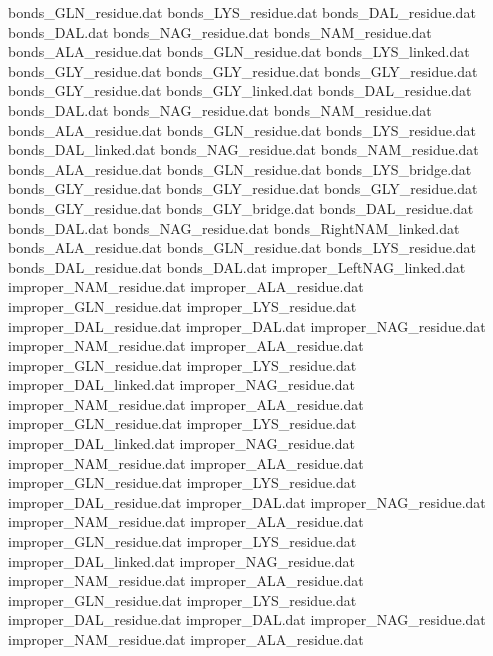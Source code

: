 bonds_GLN_residue.dat           
bonds_LYS_residue.dat           
bonds_DAL_residue.dat           
bonds_DAL.dat                   
bonds_NAG_residue.dat           
bonds_NAM_residue.dat           
bonds_ALA_residue.dat           
bonds_GLN_residue.dat           
bonds_LYS_linked.dat            
bonds_GLY_residue.dat
bonds_GLY_residue.dat
bonds_GLY_residue.dat
bonds_GLY_residue.dat
bonds_GLY_linked.dat
bonds_DAL_residue.dat           
bonds_DAL.dat                   
bonds_NAG_residue.dat           
bonds_NAM_residue.dat           
bonds_ALA_residue.dat           
bonds_GLN_residue.dat           
bonds_LYS_residue.dat           
bonds_DAL_linked.dat            
bonds_NAG_residue.dat           
bonds_NAM_residue.dat           
bonds_ALA_residue.dat           
bonds_GLN_residue.dat           
bonds_LYS_bridge.dat            
bonds_GLY_residue.dat
bonds_GLY_residue.dat
bonds_GLY_residue.dat
bonds_GLY_residue.dat
bonds_GLY_bridge.dat
bonds_DAL_residue.dat           
bonds_DAL.dat                   
bonds_NAG_residue.dat           
bonds_RightNAM_linked.dat       
bonds_ALA_residue.dat           
bonds_GLN_residue.dat           
bonds_LYS_residue.dat           
bonds_DAL_residue.dat           
bonds_DAL.dat                   
improper_LeftNAG_linked.dat     
improper_NAM_residue.dat        
improper_ALA_residue.dat        
improper_GLN_residue.dat        
improper_LYS_residue.dat        
improper_DAL_residue.dat        
improper_DAL.dat                
improper_NAG_residue.dat        
improper_NAM_residue.dat        
improper_ALA_residue.dat        
improper_GLN_residue.dat        
improper_LYS_residue.dat        
improper_DAL_linked.dat         
improper_NAG_residue.dat        
improper_NAM_residue.dat        
improper_ALA_residue.dat        
improper_GLN_residue.dat        
improper_LYS_residue.dat        
improper_DAL_linked.dat         
improper_NAG_residue.dat        
improper_NAM_residue.dat        
improper_ALA_residue.dat        
improper_GLN_residue.dat        
improper_LYS_residue.dat        
improper_DAL_residue.dat        
improper_DAL.dat                
improper_NAG_residue.dat        
improper_NAM_residue.dat        
improper_ALA_residue.dat        
improper_GLN_residue.dat        
improper_LYS_residue.dat        
improper_DAL_linked.dat         
improper_NAG_residue.dat        
improper_NAM_residue.dat        
improper_ALA_residue.dat        
improper_GLN_residue.dat        
improper_LYS_residue.dat        
improper_DAL_residue.dat        
improper_DAL.dat                
improper_NAG_residue.dat        
improper_NAM_residue.dat        
improper_ALA_residue.dat        
